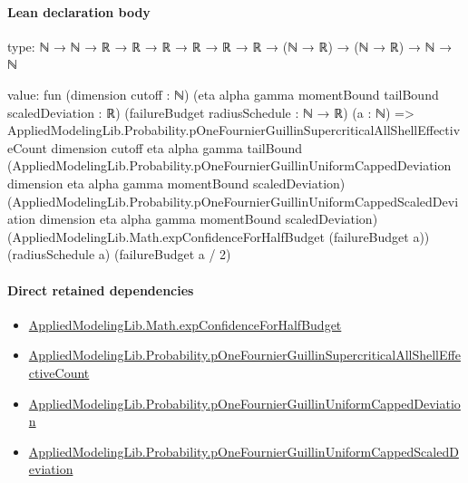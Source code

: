 \documentclass[10pt]{article}
\begin{document}
\paragraph{Lean declaration body}
\begin{ReviewVerbatim}
type:
ℕ → ℕ → ℝ → ℝ → ℝ → ℝ → ℝ → ℝ → (ℕ → ℝ) → (ℕ → ℝ) → ℕ → ℕ

value:
fun (dimension cutoff : ℕ) (eta alpha gamma momentBound tailBound scaledDeviation : ℝ)
    (failureBudget radiusSchedule : ℕ → ℝ) (a : ℕ) =>
  AppliedModelingLib.Probability.pOneFournierGuillinSupercriticalAllShellEffectiveCount dimension cutoff eta alpha gamma
    tailBound
    (AppliedModelingLib.Probability.pOneFournierGuillinUniformCappedDeviation dimension eta alpha gamma momentBound
      scaledDeviation)
    (AppliedModelingLib.Probability.pOneFournierGuillinUniformCappedScaledDeviation dimension eta alpha gamma
      momentBound scaledDeviation)
    (AppliedModelingLib.Math.expConfidenceForHalfBudget (failureBudget a)) (radiusSchedule a) (failureBudget a / 2)
\end{ReviewVerbatim}

\paragraph{Direct retained dependencies}
\begin{itemize}\raggedright
\item \hyperlink{governing-declaration-77c24384a8319860}{Applied\allowbreak{}Modeling\allowbreak{}Lib.\allowbreak{}Math.\allowbreak{}exp\allowbreak{}Confidence\allowbreak{}For\allowbreak{}Half\allowbreak{}Budget}
\item \hyperlink{governing-declaration-2116c3c509ce31b4}{Applied\allowbreak{}Modeling\allowbreak{}Lib.\allowbreak{}Probability.\allowbreak{}p\allowbreak{}One\allowbreak{}Fournier\allowbreak{}Guillin\allowbreak{}Supercritical\allowbreak{}All\allowbreak{}Shell\allowbreak{}Effective\allowbreak{}Count}
\item \hyperlink{governing-declaration-d3b37af7ee378c37}{Applied\allowbreak{}Modeling\allowbreak{}Lib.\allowbreak{}Probability.\allowbreak{}p\allowbreak{}One\allowbreak{}Fournier\allowbreak{}Guillin\allowbreak{}Uniform\allowbreak{}Capped\allowbreak{}Deviation}
\item \hyperlink{governing-declaration-284d6604fe65e6f0}{Applied\allowbreak{}Modeling\allowbreak{}Lib.\allowbreak{}Probability.\allowbreak{}p\allowbreak{}One\allowbreak{}Fournier\allowbreak{}Guillin\allowbreak{}Uniform\allowbreak{}Capped\allowbreak{}Scaled\allowbreak{}Deviation}
\end{itemize}
\hypertarget{governing-declaration-4c589a0fe589238d}{}
\end{document}
